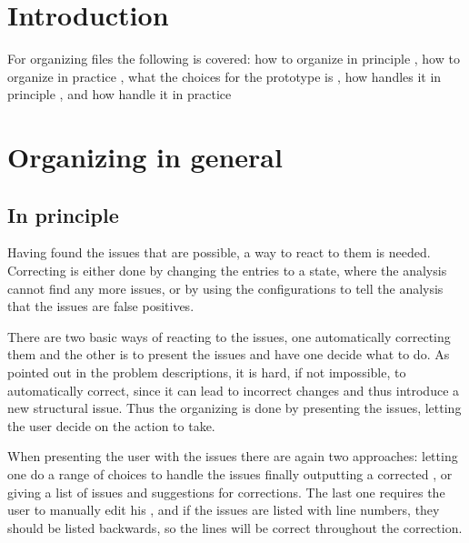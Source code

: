 
\section{Introduction}

For organizing {\bibtex} files the following is covered: how to
organize in principle , how to
organize in practice , what the
choices for the prototype {\orangutan} is
, how {\orangutan} handles it
in principle , and how
{\orangutan} handle it in practice


\section{Organizing in general}

\subsection{In principle}
\label{sec:organizing_principle}

Having found the issues that are possible, a way to react to them is
needed.  Correcting is either done by changing the entries to a state,
where the analysis cannot find any more issues, or by using the
configurations to tell the analysis that the issues are false
positives.

There are two basic ways of reacting to the issues, one
automatically correcting them and the other is to present the issues
and have one decide what to do.  As pointed out in the problem
descriptions, it is hard, if not impossible, to automatically correct,
since it can lead to incorrect changes and thus introduce a new
structural issue.  Thus the organizing is done by presenting the
issues, letting the user decide on the action to take.

When presenting the user with the issues there are again two
approaches: letting one do a range of choices to handle the issues
finally outputting a corrected , or giving a list of issues
and suggestions for corrections.  The last one requires the user to
manually edit his , and if the issues are listed with line
numbers, they should be listed backwards, so the lines will be correct
throughout the correction.

